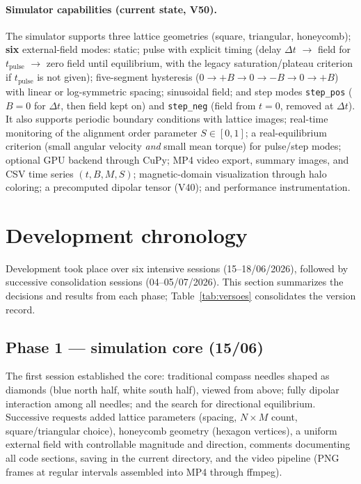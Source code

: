 \documentclass[11pt,a4paper]{article}
\newcommand{\code}[1]{\texttt{#1}}
\begin{document}
\paragraph{Simulator capabilities (current state, V50).}
The simulator supports three lattice geometries (square, triangular, honeycomb); \textbf{six} external-field modes: static; pulse with explicit timing (delay $\Delta t$ $\to$ field for $t_{\mathrm{pulse}}$ $\to$ zero field until equilibrium, with the legacy saturation/plateau criterion if $t_{\mathrm{pulse}}$ is not given); five-segment hysteresis ($0 \to +B \to 0 \to -B \to 0 \to +B$) with linear or log-symmetric spacing; sinusoidal field; and step modes \code{step\_pos} ($B{=}0$ for $\Delta t$, then field kept on) and \code{step\_neg} (field from $t{=}0$, removed at $\Delta t$). It also supports periodic boundary conditions with lattice images; real-time monitoring of the alignment order parameter $S \in [0,1]$; a real-equilibrium criterion (small angular velocity \emph{and} small mean torque) for pulse/step modes; optional GPU backend through CuPy; MP4 video export, summary images, and CSV time series $(t, B, M, S)$; magnetic-domain visualization through halo coloring; a precomputed dipolar tensor (V40); and performance instrumentation.

\section{Development chronology}

Development took place over six intensive sessions (15--18/06/2026), followed by successive consolidation sessions (04--05/07/2026). This section summarizes the decisions and results from each phase; Table~\ref{tab:versoes} consolidates the version record.

\subsection{Phase 1 --- simulation core (15/06)}

The first session established the core: traditional compass needles shaped as diamonds (blue north half, white south half), viewed from above; fully dipolar interaction among all needles; and the search for directional equilibrium. Successive requests added lattice parameters (spacing, $N \times M$ count, square/triangular choice), honeycomb geometry (hexagon vertices), a uniform external field with controllable magnitude and direction, comments documenting all code sections, saving in the current directory, and the video pipeline (PNG frames at regular intervals assembled into MP4 through ffmpeg).
\end{document}
